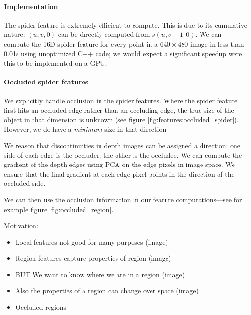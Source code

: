 \documentclass[10pt,twocolumn,letterpaper]{article}
\begin{document}
\paragraph{Implementation}
The spider feature is extremely efficient to compute.
This is due to its cumulative nature: $(u, v, 0)$ can be directly computed from $s(u, v-1, 0)$.
We can compute the 16D spider feature for every point in a $640\times480$ image in less than 0.01s using unoptimized C++ code; we would expect a significant speedup were this to be implemented on a GPU.


\paragraph{Occluded spider features}

We explicitly handle occlusion in the spider features. Where the spider feature first hits an occluded edge rather than an occluding edge, the true size of the object in that dimension is unknown (see figure \ref{fig:features:occluded_spider}).
However, we do have a \textit{minimum} size in that direction.

We reason that discontinuities in depth images can be assigned a direction: one side of each edge is the occluder, the other is the occludee. 
We can compute the gradient of the depth edges using PCA on the edge pixels in image space.
We ensure that the final gradient at each edge pixel points in the direction of the occluded side.

We can then use the occlusion information in our feature computations---see for example figure \ref{fig:occluded_region}.

Motivation:
\begin{itemize}
\item Local features not good for many purposes (image)
\item Region features capture properties of region (image)
\item BUT We want to know where we are in a region  (image)
\item Also the properties of a region can change over space (image)
\item Occluded regions
\end{itemize}
\end{document}
